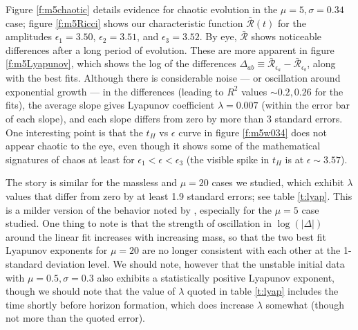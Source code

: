 \documentclass[../PhD.tex]{subfiles}
\begin{document}
Figure \ref{f:m5chaotic} details evidence for chaotic evolution in the
$\mu=5,\sigma=0.34$ case; figure \ref{f:m5Ricci} shows our characteristic
function $\bar{\mathcal{R}}(t)$ for the amplitudes $\epsilon_1 = 3.50$,
$\epsilon_2 = 3.51$, and $\epsilon_3 = 3.52$. By eye, $\bar{\mathcal{R}}$ shows
noticeable differences after a long period of evolution. These are more
apparent in figure \ref{f:m5Lyapunov}, which shows the log of the differences
$\Delta_{ab}\equiv\bar{\mathcal{R}}_{\epsilon_a}-\bar{\mathcal R}_{\epsilon_b}$,
along with the best fits. Although there is considerable noise --- or
oscillation around exponential growth --- in the
differences (leading to $R^2$ values $\sim 0.2,0.26$ for the fits), the
average slope gives Lyapunov coefficient $\lambda=0.007$ (within the error
bar of each slope), and each slope differs from zero by more than 3 standard
errors. One interesting point is that the $t_H$ vs $\epsilon$ curve
in figure \ref{f:m5w034} does not appear chaotic to the eye, even though it
shows some of the mathematical signatures of chaos at least for
$\epsilon_1<\epsilon<\epsilon_3$ (the visible spike in $t_H$ is at 
$\epsilon\sim 3.57$).

The story is similar for the massless and $\mu=20$ cases we
studied, which exhibit $\lambda$ values that
differ from zero by at least 1.9 standard errors; see table \ref{t:lyap}.
This is a milder version of the behavior noted by
\cite{1602.03535,1410.1869,1608.05402}, especially for the $\mu=5$ case
studied.  
One thing to note is that the strength of oscillation in
$\log(|\Delta|)$ around the linear fit increases with increasing
mass, so that the two best fit Lyapunov exponents for $\mu = 20$ are no
longer consistent with each other at the 1-standard deviation level.
We should note, however that the unstable initial data with 
$\mu=0.5,\sigma=0.3$ also exhibits a statistically positive Lyapunov
exponent, though we should note that the value of $\lambda$ quoted in table
\ref{t:lyap} includes the time shortly before horizon formation, which does
increase $\lambda$ somewhat (though not more than the quoted error).
\end{document}
